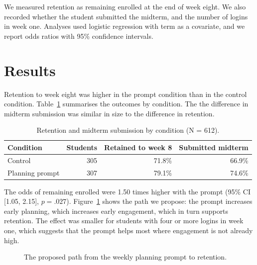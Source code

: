 \documentclass[11pt]{article}
\begin{document}
We measured retention as remaining enrolled at the end of week eight. We also recorded whether the student submitted the midterm, and the number of logins in week one. Analyses used logistic regression with term as a covariate, and we report odds ratios with 95\% confidence intervals.

\section{Results}
Retention to week eight was higher in the prompt condition than in the control condition. Table~\ref{tab:retention} summarises the outcomes by condition. The the difference in midterm submission was similar in size to the difference in retention.

\begin{table}[t]
\centering
\caption{Retention and midterm submission by condition (N = 612).}
\label{tab:retention}
\begin{tabular}{lrrr}
\toprule
Condition & Students & Retained to week 8 & Submitted midterm \\
\midrule
Control & 305 & 71.8\% & 66.9\% \\
Planning prompt & 307 & 79.1\% & 74.6\% \\
\bottomrule
\end{tabular}
\end{table}

The odds of remaining enrolled were 1.50 times higher with the prompt (95\% CI [1.05, 2.15], $p = .027$). Figure~\ref{fig:model} shows the path we propose: the prompt increases early planning, which increases early engagement, which in turn supports retention. The effect was smaller for students with four or more logins in week one, which suggests that the prompt helps most where engagement is not already high.

\begin{figure}[t]
\centering
{}
\caption{The proposed path from the weekly planning prompt to retention.}
\label{fig:model}
\end{figure}
\end{document}
